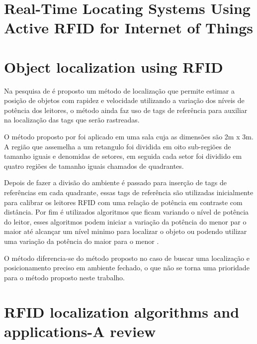 \section{Real-Time Locating Systems Using Active RFID for Internet of Things}

\section{Object localization using RFID}
Na pesquisa de \citeauthor{localization2010} é proposto um método de localização que permite estimar a posição de objetos com rapidez e velocidade utilizando a variação dos níveis de potência dos leitores, o método ainda faz uso de tags de referência para auxiliar na localização das tags que serão rastreadas.

\par
O método proposto por \citeauthor{localization2010} foi aplicado em uma sala cuja as dimensões são 2m x 3m. A região que assemelha a um retangulo foi dividida em oito sub-regiões de tamanho iguais e denomidas de setores, em seguida cada setor foi dividido em quatro regiões de tamanho iguais chamados de quadrantes. 

\par
Depois de fazer a divisão do ambiente é passado para inserção de tags de referências em cada quadrante, essas tags de referência são utilizadas inicialmente para calibrar os leitores RFID com uma relação de potência em contraste com distância. Por fim é utilizados algoritmos que ficam variando o nível de potência do leitor, esses algoritmos podem iniciar a variação da potência do menor par o maior até alcançar um nível minimo para localizar o objeto ou podendo utilizar uma variação da potência do maior para o menor \citeauthor{localization2010}.

\par
O método \citeauthor{localization2010} diferencia-se do método proposto no caso de buscar uma localização e posicionamento preciso em ambiente fechado, o que não se torna uma prioridade para o método proposto neste trabalho.
\section{RFID localization algorithms and applications-A review}